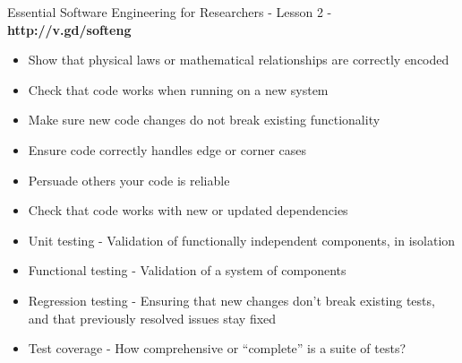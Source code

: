 \documentclass[8pt]{extarticle}
\begin{document}
\thispagestyle{empty}

\begin{center}
  {\LARGE
  Essential Software Engineering for Researchers - Lesson 2 - \textbf{http://v.gd/softeng}}
\end{center}

\begin{navybox}[title=Why test?]
  \begin{multicols}{2}
    \begin{itemize}
    \itemsep-3pt
    \item Show that physical laws or mathematical relationships are correctly encoded
    \item Check that code works when running on a new system
    \item Make sure new code changes do not break existing functionality
    \item Ensure code correctly handles edge or corner cases
    \item Persuade others your code is reliable
    \item Check that code works with new or updated dependencies
    \end{itemize}
  \end{multicols}
\end{navybox}


\begin{bluebox}[title=Useful terms]
  \begin{itemize}
    \itemsep-3pt
  \item Unit testing - Validation of functionally independent components, in
    isolation
  \item Functional testing - Validation of a system of components
  \item Regression testing - Ensuring that new changes don't break existing
    tests, and that previously resolved issues stay fixed
  \item Test coverage - How comprehensive or ``complete'' is a suite of tests?
  \end{itemize}
\end{bluebox}
\end{document}
